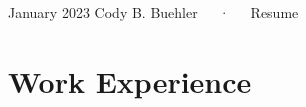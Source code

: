 \documentclass[11pt,a4paper,]{awesome-cv}
\begin{document}
\makecvheader

\makecvfooter
  {January 2023}
    { Cody B. Buehler~~~·~~~Resume}
  {\thepage}





\hypertarget{work-experience}{%
\section{Work Experience}\label{work-experience}}
\end{document}
